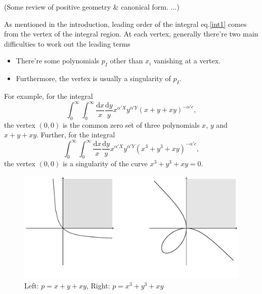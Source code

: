 \documentclass[12pt]{article}
\theoremstyle{definition}
\theoremstyle{plain}
\newcommand{\dif}{\mathrm{d}} %
\begin{document}
(Some review of positive geometry \& canonical form. ...)

As mentioned in the introduction, leading order of the integral eq.\eqref{int1} comes from the vertex
of the integral region. 
At each vertex, generally there're two main difficulties to work out the leading terms
\begin{itemize}
	\item There're some polynomials $p_I$ other than $x_i$ vanishing at a vertex.
	\item Furthermore, the vertex is usually a singularity of $p_I$.
\end{itemize}
For example, for the integral 
\[
	\int_0^\infty \int_0^\infty \frac{\dif x}{x}\frac{\dif y}{y}x^{\alpha' X}
	y^{\alpha' Y}(x+y+ xy)^{-\alpha' c},
\] 
the vertex $(0,0)$ is the common zero set of three polynomials $x$, $y$ and $x+y+xy$. 
Further, for the integral 
\[
	\int_0^\infty \int_0^\infty \frac{\dif x}{x}\frac{\dif y}{y}x^{\alpha' X}
	y^{\alpha' Y}(x^3+y^3+ xy)^{-\alpha' c},
\] 
the vertex $(0,0)$ is a singularity of the curve $x^3+y^3+xy=0$. 

\begin{figure}[t]
\begin{center}
\includegraphics[scale=0.75]{fig_1.pdf}
\end{center}
\vspace{-5ex}
\caption{Left: $p=x+y+xy$, Right: $p=x^3+y^3+xy$}
\end{figure}

\end{document}
